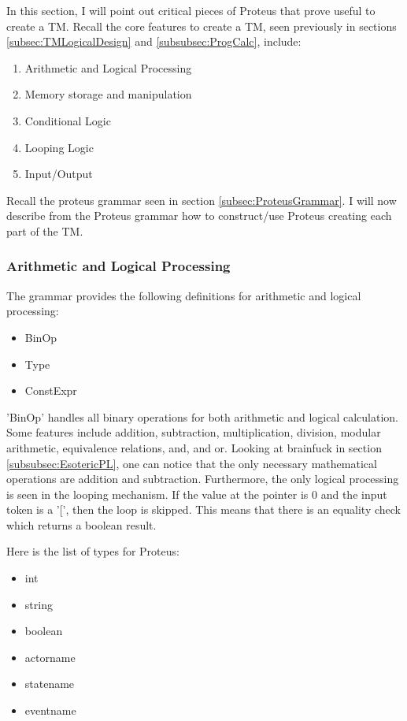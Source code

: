In this section, I will point out critical pieces of Proteus that prove useful to create a TM.
Recall the core features to create a TM, seen previously in sections \ref{subsec:TMLogicalDesign} and \ref{subsubsec:ProgCalc}, include:

\begin{enumerate}
    \item Arithmetic and Logical Processing
    \item Memory storage and manipulation
    \item Conditional Logic
    \item Looping Logic
    \item Input/Output
\end{enumerate}

Recall the proteus grammar seen in section \ref{subsec:ProteusGrammar}.
I will now describe from the Proteus grammar how to construct/use Proteus creating each part of the TM.

\subsubsection{Arithmetic and Logical Processing}\label{subsubsec:ArithLogProc}

The grammar provides the following definitions for arithmetic and logical processing:

\begin{itemize}
    \item BinOp
    \item Type
    \item ConstExpr
\end{itemize}

'BinOp' handles all binary operations for both arithmetic and logical calculation.
Some features include addition, subtraction, multiplication, division, modular arithmetic, equivalence relations, and, and or.
Looking at brainfuck in section \ref{subsubsec:EsotericPL}, one can notice that the only necessary mathematical operations are addition and subtraction.
Furthermore, the only logical processing is seen in the looping mechanism.
If the value at the pointer is 0 and the input token is a '[', then the loop is skipped.
This means that there is an equality check which returns a boolean result.

Here is the list of types for Proteus:
\begin{itemize}
    \item int
    \item string
    \item boolean
    \item actorname
    \item statename
    \item eventname
\end{itemize}

